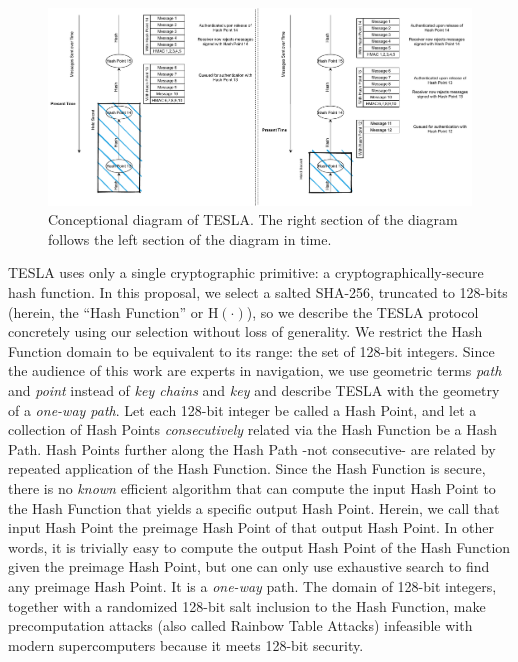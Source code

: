 \documentclass[letterpaper,times]{IONconf/IONconf}
\begin{document}
\begin{figure}
\centering
\includegraphics[width=\linewidth]{fig/TESLADiagram.pdf}
\caption{Conceptional diagram of TESLA. The right section of the diagram follows the left section of the diagram in time.}
\label{fig: TESLA Diagram}
\end{figure}

TESLA uses only a single cryptographic primitive: a cryptographically-secure hash function.
In this proposal, we select a salted SHA-256, truncated to 128-bits (herein, the ``Hash Function'' or $\textrm{H}(\cdot)$), so we describe the TESLA protocol concretely using our selection without loss of generality.
We restrict the Hash Function domain to be equivalent to its range: the set of 128-bit integers.
Since the audience of this work are experts in navigation, we use geometric terms {\em path} and {\em point} instead of {\em key chains} and {\em key} and describe TESLA with the geometry of a {\em one-way path}.
Let each 128-bit integer be called a Hash Point, and let a collection of Hash Points {\em consecutively} related via the Hash Function be a Hash Path.
Hash Points further along the Hash Path -not consecutive- are related by repeated application of the Hash Function.
Since the Hash Function is secure, there is no {\em known} efficient algorithm that can compute the input Hash Point to the Hash Function that yields a specific output Hash Point.
Herein, we call that input Hash Point the preimage Hash Point of that output Hash Point.
In other words, it is trivially easy to compute the output Hash Point of the Hash Function given the preimage Hash Point, but one can only use exhaustive search to find any preimage Hash Point.
It is a {\em one-way} path.
The domain of 128-bit integers, together with a randomized 128-bit salt inclusion to the Hash Function, make precomputation attacks (also called Rainbow Table Attacks) infeasible with modern supercomputers because it meets 128-bit security.
\end{document}
